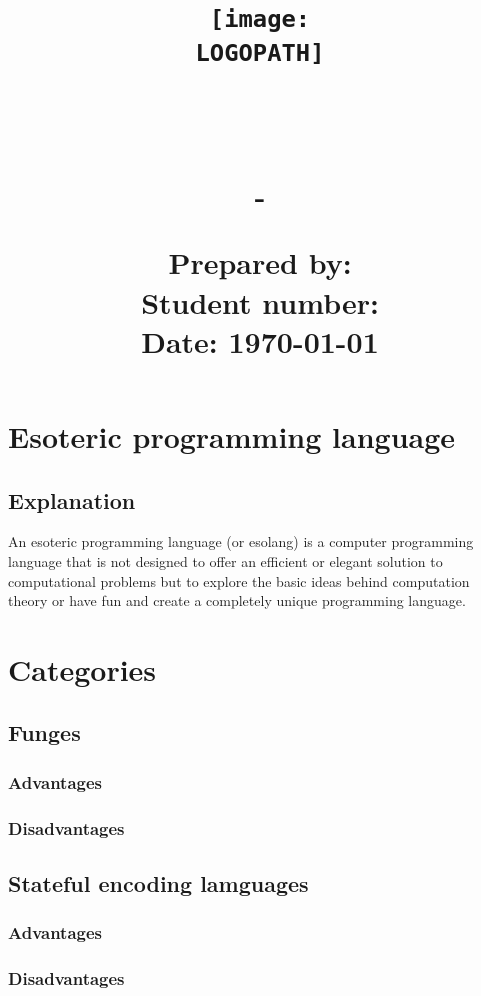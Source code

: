 \documentclass[12pt]{article}
\title{
    \texttt{[image: \\LOGOPATH]} \\
    \begin{center}
        \hfill \\
        \Large{\DEPARTEMENT} \\
        \Large{\COURSENUM\;-\;\COURSENAME} \\
        \vfill
        \textbf{\LARGE{\REPORTTITLE}}
    \end{center}
    \mbox{}
    \vfill
    \date{}
    \begin{flushleft}
        \Large{\textbf{Prepared by:} \STUDENTNAME} \\
        \Large{\textbf{Student number:} \STUDENTID} \\
        \Large{\textbf{Date:} \today}
    \end{flushleft}
}
\begin{document}
\maketitle

\newpage
\tableofcontents
\newpage

\section{Esoteric programming language \hfill {}}
\subsection{Explanation}
An esoteric programming language (or esolang) is a computer programming language that is not designed to offer an efficient or elegant solution to computational problems but to explore the basic ideas behind computation theory or have fun and create a completely unique programming language.
\cite{Question1Explain1}
\cite{Question1Explain2}
\section{Categories \hfill {}}
\subsection{Funges}
\subsubsection{Advantages}
\subsubsection{Disadvantages}
\subsection{Stateful encoding lamguages}
\subsubsection{Advantages}
\subsubsection{Disadvantages}
\end{document}
